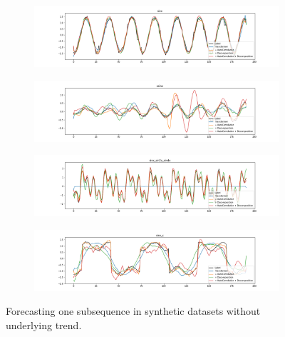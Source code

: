 \begin{figure}[ht]
    \centering
    \begin{subfigure}{0.75\textwidth}
        \includegraphics[width=\textwidth]{img/pred_sinx.png}
    \end{subfigure}
    \begin{subfigure}{0.75\textwidth}
        \includegraphics[width=\textwidth]{img/pred_xsinx.png}
    \end{subfigure}
    \begin{subfigure}{0.75\textwidth}
        \includegraphics[width=\textwidth]{img/pred_sinx_sin2x_sin4x.png}
    \end{subfigure}
    \begin{subfigure}{0.75\textwidth}
        \includegraphics[width=\textwidth]{img/pred_sinx_c.png}
    \end{subfigure}
    \caption{Forecasting one subsequence in synthetic datasets without underlying trend.}
\end{figure}

